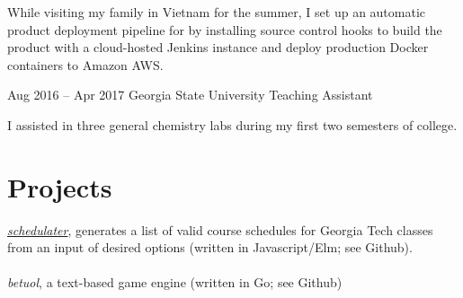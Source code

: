 \documentclass{tccv}
\begin{document}
\begin{minipage}[t]{0.65\textwidth}
\begin{eventlist}
    While visiting my family in Vietnam for the summer, I set up an automatic product deployment pipeline for by installing source control hooks to build the product with a cloud-hosted Jenkins instance and deploy production Docker containers to Amazon AWS.

\item{Aug 2016 -- Apr 2017}
     {Georgia State University}
     {Teaching Assistant}

    I assisted in three general chemistry labs during my first two semesters of college.

\section{Projects}

\href{https://stnma7e.github.io/schedulater}{\emph{schedulater}}, generates a list of valid course schedules for Georgia Tech classes from an input of desired options (written in Javascript/Elm; see Github). 
\\ \\
\emph{betuol}, a text-based game engine (written in Go; see Github)

\end{eventlist}
\end{minipage}
\end{document}

